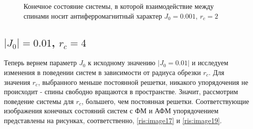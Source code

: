 \documentclass[14pt,a4paper,report]{ncc}
\begin{document}
\begin{figure}[h!]
\begin{minipage}[h]{0.49\linewidth}
\end{minipage}
\hfill
\begin{minipage}[h]{0.49\linewidth}
\end{minipage}
\caption{Конечное состояние системы, в которой взаимодействие между спинами носит антиферромагнитный характер $J_0=0.001$, $r_c=2$}
\label{ris:image16}
\end{figure}


\newpage
\subsection{$|J_0|=0.01$, $r_c=4$}

Теперь вернем параметр $J_0$ к исходному значению $|J_0=0.01|$ и исследуем изменения в поведении систем в зависимости от радиуса обрезки $r_c$. Для значения $r_c$, выбранного меньше постоянной решетки, никакого упорядочения не происходит - спины свободно вращаются в пространстве. Значит, рассмотрим поведение системы для $r_c$, большего, чем постоянная решетки. Соответствующие изображения конечных состояний систем с ФМ и АФМ упорядочением представлены на рисунках, соответственно, \ref{ris:image17} и \ref{ris:image19}.
\
\end{document}
